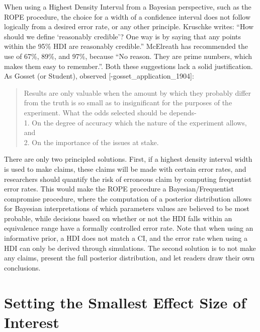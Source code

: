\documentclass[
  oneside]{book}
\begin{document}
When using a Highest Density Interval from a Bayesian perspective, such as the ROPE procedure, the choice for a width of a confidence interval does not follow logically from a desired error rate, or any other principle. Kruschke \citeyearpar{kruschke_doing_2014} writes: ``How should we define `reasonably credible'? One way is by saying that any points within the 95\% HDI are reasonably credible.'' McElreath \citeyearpar{mcelreath_statistical_2016} has recommended the use of 67\%, 89\%, and 97\%, because ``No reason. They are prime numbers, which makes them easy to remember.''. Both these suggestions lack a solid justification. As Gosset (or Student), observed {[}-gosset\_application\_1904{]}:

\begin{quote}
Results are only valuable when the amount by which they probably differ from the truth is so small as to insignificant for the purposes of the experiment. What the odds selected should be depends-\\
1. On the degree of accuracy which the nature of the experiment allows, and\\
2. On the importance of the issues at stake.
\end{quote}

There are only two principled solutions. First, if a highest density interval width is used to make claims, these claims will be made with certain error rates, and researchers should quantify the risk of erroneous claim by computing frequentist error rates. This would make the ROPE procedure a Bayesian/Frequentist compromise procedure, where the computation of a posterior distribution allows for Bayesian interpretations of which parameters values are believed to be most probable, while decisions based on whether or not the HDI falls within an equivalence range have a formally controlled error rate. Note that when using an informative prior, a HDI does not match a CI, and the error rate when using a HDI can only be derived through simulations. The second solution is to not make any claims, present the full posterior distribution, and let readers draw their own conclusions.

\hypertarget{sesoi}{%
\section{Setting the Smallest Effect Size of Interest}\label{sesoi}}
\end{document}
